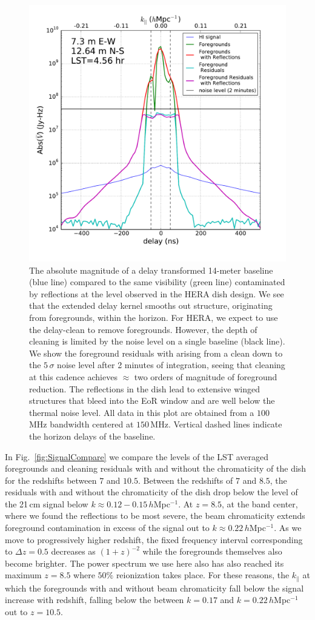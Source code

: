 \documentclass[twocolumn]{emulateapj}
\begin{document}
\begin{figure}
\includegraphics[width=.5\textwidth]{figures/cleaning_noise_Nithya.pdf}
\caption{The absolute magnitude of a delay transformed 14-meter baseline (blue line) compared to the same visibility (green line) contaminated by reflections at the level observed in the HERA dish design. We see that the extended delay kernel smooths out structure, originating from foregrounds, within the horizon. For HERA, we expect to use the delay-clean to remove foregrounds. However, the depth of cleaning is limited by the noise level on a single baseline (black line). We show the foreground residuals with arising from a clean down to the $5\,\sigma$ noise level after 2 minutes of integration, seeing that cleaning at this cadence achieves $\approx$ two orders of magnitude of foreground reduction. The reflections in the dish lead to extensive winged structures that bleed into the EoR window and are well below the thermal noise level. All data in this plot are obtained from a $100$\,MHz bandwidth centered at $150$\,MHz. Vertical dashed lines indicate the horizon delays of the baseline.}
\label{fig:Cleaning}
\end{figure}

In Fig.~\ref{fig:SignalCompare} we compare the levels of the LST averaged foregrounds and cleaning residuals with and without the chromaticity of the dish for the redshifts between $7$ and $10.5$. Between the redshifts of $7$ and $8.5$, the residuals with and without the chromaticity of the dish drop below the level of the 21\,cm signal below $k \approx 0.12-0.15$\,$h$Mpc$^{-1}$. At $z = 8.5$, at the band center, where we found the reflections to be most severe, the beam chromaticity extends foreground contamination in excess of the signal out to $k \approx 0.22$\,$h$Mpc$^{-1}$. As we move to progressively higher redshift, the fixed frequency interval corresponding to $\Delta z = 0.5$ decreases as $(1+z)^{-2}$ while the foregrounds themselves also become brighter. The power spectrum we use here also has also reached its maximum $z=8.5$ where $50\%$ reionization takes place. For these reasons, the $k_\parallel$ at which the foregrounds with and without beam chromaticity fall below the signal increase with redshift, falling below the between $k=0.17$ and $k=0.22$\,$h$Mpc$^{-1}$ out to $z=10.5$.  
\end{document}
